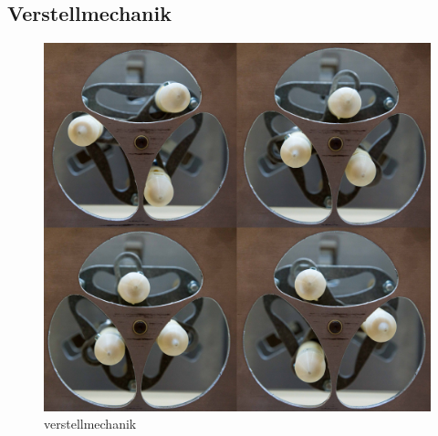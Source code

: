 \subsection{Verstellmechanik} \label{sec:Inbetriebnahme_Verstellmechanik}

\begin{figure}[H]
	\includegraphics[width=1\textwidth]{Illustrationen/7-Inbetriebnahme_und_Kalibration/verstellmechanik.jpg}
	\caption{verstellmechanik}
	\label{fig:verstellmechanik}
\end{figure}